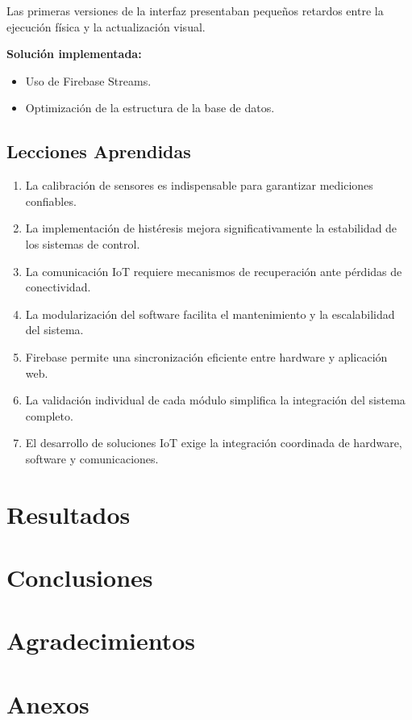 \documentclass[conference]{IEEEtran}
\begin{document}
Las primeras versiones de la interfaz presentaban pequeños retardos entre la ejecución física y la actualización visual.

\textbf{Solución implementada:}
\begin{itemize}
    \item Uso de Firebase Streams.
    \item Optimización de la estructura de la base de datos.
\end{itemize}

\subsection{Lecciones Aprendidas}

\begin{enumerate}
    \item La calibración de sensores es indispensable para garantizar mediciones confiables.
    \item La implementación de histéresis mejora significativamente la estabilidad de los sistemas de control.
    \item La comunicación IoT requiere mecanismos de recuperación ante pérdidas de conectividad.
    \item La modularización del software facilita el mantenimiento y la escalabilidad del sistema.
    \item Firebase permite una sincronización eficiente entre hardware y aplicación web.
    \item La validación individual de cada módulo simplifica la integración del sistema completo.
    \item El desarrollo de soluciones IoT exige la integración coordinada de hardware, software y comunicaciones.
\end{enumerate}

\section{Resultados}\label{sec:resultados}
  

\section{Conclusiones}\label{sec:conclusiones}
  

\section*{Agradecimientos}\label{sec:agradecimientos}
  




\footnotesize
\section{Anexos}\label{sec:anexos}
  
\end{document}
